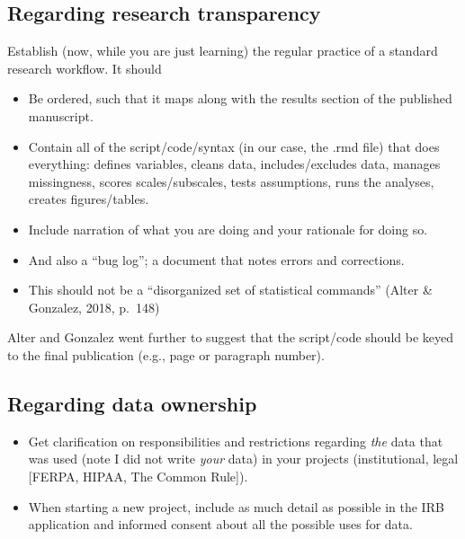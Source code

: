 \documentclass[
  english,
]{book}
\providecommand{\tightlist}{%
  \setlength{\itemsep}{0pt}\setlength{\parskip}{0pt}}
\begin{document}
\hypertarget{regarding-research-transparency}{%
\subsection{Regarding research transparency}\label{regarding-research-transparency}}

Establish (now, while you are just learning) the regular practice of a standard research workflow. It should

\begin{itemize}
\tightlist
\item
  Be ordered, such that it maps along with the results section of the published manuscript.
\item
  Contain all of the script/code/syntax (in our case, the .rmd file) that does everything: defines variables, cleans data, includes/excludes data, manages missingness, scores scales/subscales, tests assumptions, runs the analyses, creates figures/tables.
\item
  Include narration of what you are doing and your rationale for doing so.
\item
  And also a ``bug log''; a document that notes errors and corrections.
\item
  This should not be a ``disorganized set of statistical commands'' (Alter \& Gonzalez, 2018, p.~148)
\end{itemize}

Alter and Gonzalez \citeyearpar{alter_responsible_2018} went further to suggest that the script/code should be keyed to the final publication (e.g., page or paragraph number).

\hypertarget{regarding-data-ownership}{%
\subsection{Regarding data ownership}\label{regarding-data-ownership}}

\begin{itemize}
\tightlist
\item
  Get clarification on responsibilities and restrictions regarding \emph{the} data that was used (note I did not write \emph{your} data) in your projects (institutional, legal {[}FERPA, HIPAA, The Common Rule{]}).
\item
  When starting a new project, include as much detail as possible in the IRB application and informed consent about all the possible uses for data.
\end{itemize}
\end{document}

